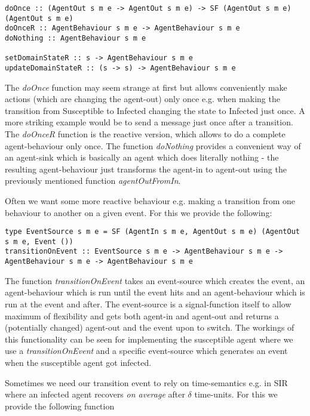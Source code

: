 \begin{verbatim}
doOnce :: (AgentOut s m e -> AgentOut s m e) -> SF (AgentOut s m e) (AgentOut s m e)
doOnceR :: AgentBehaviour s m e -> AgentBehaviour s m e
doNothing :: AgentBehaviour s m e

setDomainStateR :: s -> AgentBehaviour s m e
updateDomainStateR :: (s -> s) -> AgentBehaviour s m e
\end{verbatim}

The \textit{doOnce} function may seem strange at first but allows conveniently make actions (which are changing the agent-out) only once e.g. when making the transition from Susceptible to Infected changing the state to Infected just once. A more striking example would be to send a message just once after a transition. The \textit{doOnceR} function is the reactive version, which allows to do a complete agent-behaviour only once. The function \textit{doNothing} provides a convenient way of an agent-sink which is basically an agent which does literally nothing - the resulting agent-behaviour just transforms the agent-in to agent-out using the previously mentioned function \textit{agentOutFromIn}.

Often we want some more reactive behaviour e.g. making a transition from one behaviour to another on a given event. For this we provide the following:

\begin{verbatim}
type EventSource s m e = SF (AgentIn s m e, AgentOut s m e) (AgentOut s m e, Event ())
transitionOnEvent :: EventSource s m e -> AgentBehaviour s m e -> AgentBehaviour s m e -> AgentBehaviour s m e
\end{verbatim}

The function \textit{transitionOnEvent} takes an event-source which creates the event, an agent-behaviour which is run until the event hits and an agent-behaviour which is run at the event and after. The event-source is a signal-function itself to allow maximum of flexibility and gets both agent-in and agent-out and returns a (potentially changed) agent-out and the event upon to switch. 
The workings of this functionality can be seen for implementing the susceptible agent where we use a \textit{transitionOnEvent} and a specific event-source which generates an event when the susceptible agent got infected.

Sometimes we need our transition event to rely on time-semantics e.g. in SIR where an infected agent recovers \textit{on average} after $\delta$ time-units. For this we provide the following function

